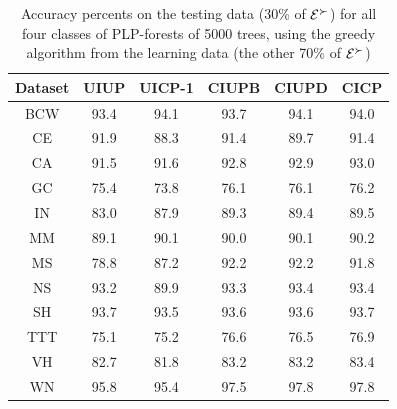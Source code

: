 {
	\begin{table}
	  \centering
	  \begin{tabular}{ |c||c|c|c|c|c| }
	    \hline
	    Dataset          				 & UIUP & UICP-1 & CIUPB & CIUPD & CICP \\
	    \hline \hline                                              
	    BCW                      & 93.4 & 94.1   & 93.7  & 94.1  & 94.0 \\ \hline
	    CE                       & 91.9 & 88.3   & 91.4  & 89.7  & 91.4 \\ \hline
	    CA                       & 91.5 & 91.6   & 92.8  & 92.9  & 93.0 \\ \hline 
	    GC                       & 75.4 & 73.8   & 76.1  & 76.1  & 76.2 \\ \hline     
	    IN                       & 83.0 & 87.9   & 89.3  & 89.4  & 89.5 \\ \hline   
	    MM                       & 89.1 & 90.1   & 90.0  & 90.1  & 90.2 \\ \hline         
	    MS                       & 78.8 & 87.2   & 92.2  & 92.2  & 91.8 \\ \hline 
	    NS                       & 93.2 & 89.9   & 93.3  & 93.4  & 93.4 \\ \hline
	    SH                       & 93.7 & 93.5   & 93.6  & 93.6  & 93.7 \\ \hline   
	    TTT                      & 75.1 & 75.2   & 76.6  & 76.5  & 76.9 \\ \hline 
	    VH                       & 82.7 & 81.8   & 83.2  & 83.2  & 83.4 \\ \hline
	    WN                       & 95.8 & 95.4   & 97.5  & 97.8  & 97.8 \\ \hline
	  \end{tabular}
	  \caption{Accuracy percents on the testing data (30\% of $\mathcal{E}^\succ$)
						 for all four classes of PLP-forests of 5000 trees, 
						 using the greedy algorithm from the learning 
						 data (the other 70\% of $\mathcal{E}^\succ$)}
	  \label{tbl:forests2}
	\end{table}
}

